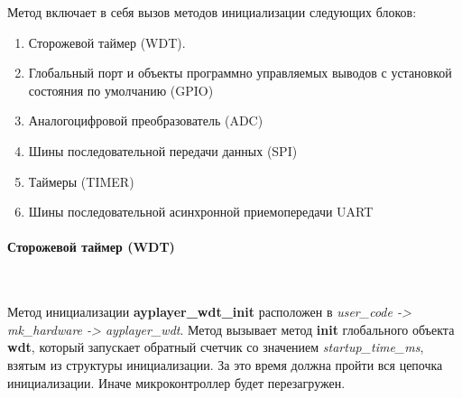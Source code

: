 \documentclass[a4paper, 12pt]{article}
\begin{document}
Метод включает в себя вызов методов инициализации следующих блоков:
\begin{enumerate}
	\item Сторожевой таймер (WDT).
	\item Глобальный порт и объекты программно управляемых выводов с установкой состояния по умолчанию (GPIO)
	\item Аналогоцифровой преобразователь (ADC)
	\item Шины последовательной передачи данных (SPI)
	\item Таймеры (TIMER)
	\item Шины последовательной асинхронной приемопередачи UART
\end{enumerate}
	
\paragraph{Сторожевой таймер (WDT)}~\

Метод инициализации \textbf{ayplayer\_wdt\_init} расположен в \textit{user\_\-code -> mk\_\-hardware -> ayplayer\_wdt}. Метод вызывает метод \textbf{init} глобального объекта \textbf{wdt}, который запускает обратный счетчик со значением \textit{startup\_time\_ms}, взятым из структуры инициализации. За это время должна пройти вся цепочка инициализации. Иначе микроконтроллер будет перезагружен.
\end{document}

